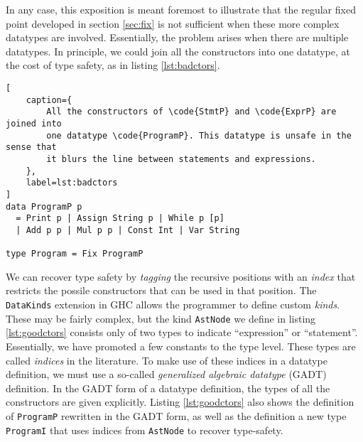 \documentclass[letterpaper,11pt]{article}
\newcommand{\code}{\texttt}
\begin{document}
In any case, this exposition is meant foremost to illustrate that the regular
fixed point developed in section \ref{sec:fix} is not sufficient when these
more complex datatypes are involved. Essentially, the problem arises when there
are multiple datatypes. In principle, we could join all the constructors into
one datatype, at the cost of type safety, as in listing \ref{lst:badctors}.

\begin{lstlisting}[
    caption={
        All the constructors of \code{StmtP} and \code{ExprP} are joined into
        one datatype \code{ProgramP}. This datatype is unsafe in the sense that
        it blurs the line between statements and expressions.
    },
    label=lst:badctors
]
data ProgramP p
  = Print p | Assign String p | While p [p]
  | Add p p | Mul p p | Const Int | Var String

type Program = Fix ProgramP
\end{lstlisting}

We can recover type safety by \emph{tagging} the recursive positions with an
\emph{index} that restricts the possile constructors that can be used in that
position. The \code{DataKinds} extension in GHC allows the programmer to define
custom \emph{kinds}. These may be fairly complex, but the kind \code{AstNode}
we define in listing \ref{lst:goodctors} consists only of two types to indicate
``expression'' or ``statement''. Essentially, we have promoted a few constants
to the type level. These types are called \emph{indices} in the literature. To
make use of these indices in a datatype definition, we must use a so-called
\emph{generalized algebraic datatype} (GADT) definition. In the GADT form of a
datatype definition, the types of all the constructors are given explicitly.
Listing \ref{lst:goodctors} also shows the definition of \code{ProgramP}
rewritten in the GADT form, as well as the definition a new type
\code{ProgramI} that uses indices from \code{AstNode} to recover type-safety.
\end{document}
